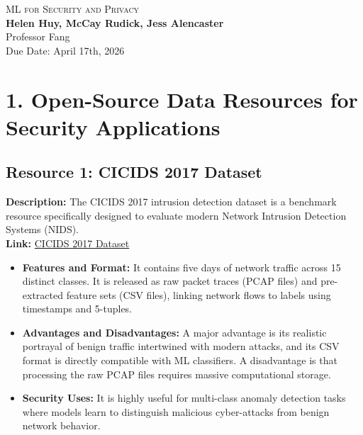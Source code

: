 \documentclass[letterpaper]{article}
\newcommand{\labTitle}{ML for Security and Privacy }
\newcommand{\labDueDate}{April 17th, 2026}
\newcommand{\labClassTime}{}
\newcommand{\labClassInstructor}{Professor Fang}
\newcommand{\labAuthorName}{\textbf{Helen Huy, McCay Rudick, Jess Alencaster}}
\begin{document}
\thispagestyle{empty}


\vspace*{\fill}
\begin{center}
    {\Huge \scshape \labTitle} \\ \vspace{10pt}
    {\Large \labAuthorName} \\ \vspace{5pt}
    {\large \labClassInstructor \ \labClassTime} \\ \vspace{5pt}
    {\large Due Date: \labDueDate}
\end{center} 
\vspace*{\fill}

\newpage

\section{1. Open-Source Data Resources for Security Applications}

\subsection*{Resource 1: CICIDS 2017 Dataset} 
\textbf{Description:} The CICIDS 2017 intrusion detection dataset is a benchmark resource specifically designed to evaluate modern Network Intrusion Detection Systems (NIDS). \\
\textbf{Link:} \href{https://www.unb.ca/cic/datasets/ids-2017.html}{CICIDS 2017 Dataset}
\begin{itemize}
    \item \textbf{Features and Format:} It contains five days of network traffic across 15 distinct classes. It is released as raw packet traces (PCAP files) and pre-extracted feature sets (CSV files), linking network flows to labels using timestamps and 5-tuples.
    \item \textbf{Advantages and Disadvantages:} A major advantage is its realistic portrayal of benign traffic intertwined with modern attacks, and its CSV format is directly compatible with ML classifiers. A disadvantage is that processing the raw PCAP files requires massive computational storage.
    \item \textbf{Security Uses:} It is highly useful for multi-class anomaly detection tasks where models learn to distinguish malicious cyber-attacks from benign network behavior.
\end{itemize}
\end{document}
